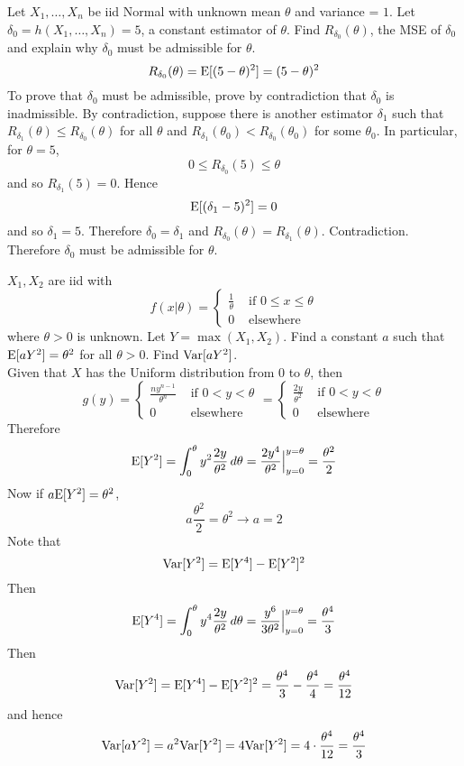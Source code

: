 \documentclass[12pt]{article}
\begin{document}
\begin{question} Let $X_1,\dots,X_n$ be iid Normal with unknown mean $\theta$ and variance = $1$. Let $\delta_0 = h(X_1,\dots,X_n) = 5$, a constant estimator of $\theta$. Find $R_{\delta_0}(\theta)$, the MSE of $\delta_0$ and explain why $\delta_0$ must be admissible for $\theta$.  
$$ R_{\delta_0}(\theta) = \mathrm{E}[ (5-\theta)^2 ] = (5-\theta)^2$$
To prove that $\delta_0$ must be admissible, prove by contradiction that $\delta_0$ is inadmissible. By contradiction, suppose there is another estimator $\delta_1$ such that $R_{\delta_1}(\theta) \leq R_{\delta_0}(\theta)$ for all $\theta$ and $R_{\delta_1}(\theta_0) < R_{\delta_0}(\theta_0)$ for some $\theta_0$. In particular, for $\theta = 5$, $$ 0 \leq R_{\delta_0}(5) \leq \theta$$ and so $R_{\delta_1}(5) = 0$. Hence $$ \mathrm{E}[ (\delta_1 - 5)^2 ] = 0 $$ and so $\delta_1 = 5$. Therefore $\delta_0 = \delta_1$ and $R_{\delta_0}(\theta) = R_{\delta_1}(\theta)$. Contradiction. Therefore $\delta_0$ must be admissible for $\theta$. 

\end{question} 

\begin{question} $X_1,X_2$ are iid with $$ f(x | \theta) = \begin{cases} \frac{1}{\theta} &\text{ if } 0 \leq x \leq \theta \\ 0 &\text{ elsewhere } \end{cases} $$ where $\theta > 0$ is unknown. Let $Y = \max(X_1,X_2)$. Find a constant $a$ such that $\mathrm{E}[ aY^2 ] = \theta^2$ for all $\theta > 0$. Find $\mathrm{Var}[ aY^2 ]$.  \\
Given that $X$ has the Uniform distribution from $0$ to $\theta$, then $$ g(y) = \begin{cases} \frac{ny^{n-1}}{\theta^n} &\text{ if } 0 < y < \theta \\ 0 &\text{ elsewhere } \end{cases} = \begin{cases} \frac{2y}{\theta^2} &\text{ if } 0 < y < \theta \\ 0 &\text{ elsewhere } \end{cases} $$ 
Therefore $$ \mathrm{E}[ Y^2 ] = \int_0^\theta y^2 \frac{2y}{\theta^2} \, d\theta = \frac{2y^4}{\theta^2}\Big|_{y=0}^{y=\theta} = \frac{\theta^2}{2} $$ Now if $a\mathrm{E}[ Y^2 ] = \theta^2$, $$ a\frac{\theta^2}{2} = \theta^2 \to a = 2 $$ 
Note that $$\mathrm{Var}[ Y^2 ] = \mathrm{E}[ Y^4 ] - \mathrm{E}[ Y^2 ]^2 $$ 
Then $$ \mathrm{E}[ Y^4 ] = \int_0^\theta y^4 \frac{2y}{\theta^2} \, d\theta = \frac{y^6}{3\theta^2}\Big|_{y=0}^{y=\theta} = \frac{\theta^4}{3} $$ Then $$ \mathrm{Var}[ Y^2 ] = \mathrm{E}[ Y^4 ] - \mathrm{E}[ Y^2 ]^2 = \frac{\theta^4}{3} - \frac{\theta^4}{4} = \frac{\theta^4}{12} $$ and hence $$ \mathrm{Var}[ aY^2 ] = a^2\mathrm{Var}[ Y^2 ] = 4 \mathrm{Var}[ Y^2 ] = 4 \cdot \frac{\theta^4}{12} = \frac{\theta^4}{3} $$ 
\end{question} 
\end{document}
